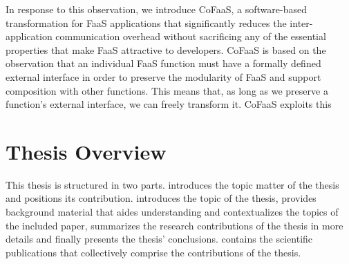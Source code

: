 \documentclass[../main.tex]{subfiles}
\begin{document}
\begin{refsection}
In response to this observation, we introduce CoFaaS, a software-based
transformation for FaaS applications that significantly reduces the
inter-application communication overhead without sacrificing any of
the essential properties that make FaaS attractive to
developers. CoFaaS is based on the observation that an individual FaaS
function must have a formally defined external interface in order to
preserve the modularity of FaaS and support composition with other
functions. This means that, as long as we preserve a function's
external interface, we can freely transform it. CoFaaS exploits this 

\section{Thesis Overview}
This thesis is structured in two parts.  introduces the
topic matter of the thesis and positions its
contribution.  introduces the topic of the thesis,
 provides background material that aides
understanding and contextualizes the topics of the included paper,
 summarizes the research contributions of the
thesis in more details and finally  presents
the thesis' conclusions.  contains the scientific
publications that collectively comprise the contributions of the
thesis.

\ifx\chapincluded\undefined
  \printbibliography
  \end{refsection}
 \fi
\end{document}
